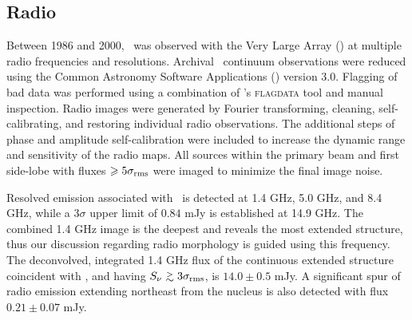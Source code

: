 \documentclass[useAMS,usenatbib]{mn2e}
\begin{document}
\subsection{Radio}
\label{sec:radio}

Between 1986 and 2000, \irs\ was observed with the Very Large Array
(\vla) at multiple radio frequencies and resolutions. Archival
\vla\ continuum observations were reduced using the Common Astronomy
Software Applications (\casa) version 3.0. Flagging of bad data was
performed using a combination of \casa's {\textsc{flagdata}} tool and
manual inspection. Radio images were generated by Fourier
transforming, cleaning, self-calibrating, and restoring individual
radio observations. The additional steps of phase and amplitude
self-calibration were included to increase the dynamic range and
sensitivity of the radio maps. All sources within the primary beam and
first side-lobe with fluxes $\ge 5\sigma_{\rm{rms}}$ were imaged to
minimize the final image noise.

Resolved emission associated with \irs\ is detected at 1.4 GHz, 5.0
GHz, and 8.4 GHz, while a $3\sigma$ upper limit of $0.84$ mJy is
established at 14.9 GHz. The combined 1.4 GHz image is the deepest and
reveals the most extended structure, thus our discussion regarding
radio morphology is guided using this frequency. The deconvolved,
integrated 1.4 GHz flux of the continuous extended structure
coincident with \irs, and having $S_{\nu} \ga 3\sigma_{\rm{rms}}$, is
$14.0 \pm 0.5$ mJy. A significant spur of radio emission extending
northeast from the nucleus is also detected with flux $0.21 \pm 0.07$
mJy.
\end{document}
